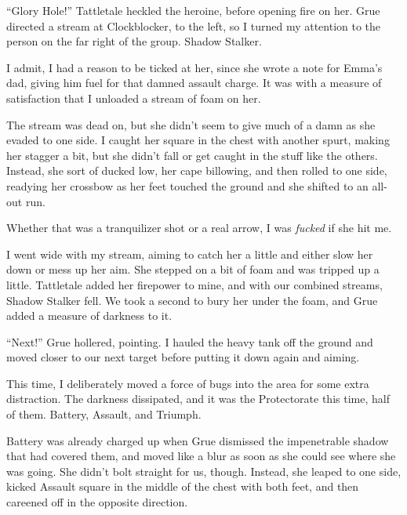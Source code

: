 ``Glory Hole!'' Tattletale heckled the heroine, before opening fire on her.  Grue directed a stream at Clockblocker, to the left, so I turned my attention to the person on the far right of the group.  Shadow Stalker.



I admit, I had a reason to be ticked at her, since she wrote a note for Emma's dad, giving him fuel for that damned assault charge.  It was with a measure of satisfaction that I unloaded a stream of foam on her.



The stream was dead on, but she didn't seem to give much of a damn as she evaded to one side.  I caught her square in the chest with another spurt, making her stagger a bit, but she didn't fall or get caught in the stuff like the others.  Instead, she sort of ducked low, her cape billowing, and then rolled to one side, readying her crossbow as her feet touched the ground and she shifted to an all-out run.



Whether that was a tranquilizer shot or a real arrow, I was \emph{fucked} if she hit me.



I went wide with my stream, aiming to catch her a little and either slow her down or mess up her aim.  She stepped on a bit of foam and was tripped up a little.  Tattletale added her firepower to mine, and with our combined streams, Shadow Stalker fell.  We took a second to bury her under the foam, and Grue added a measure of darkness to it.



``Next!'' Grue hollered, pointing.  I hauled the heavy tank off the ground and moved closer to our next target before putting it down again and aiming.



This time, I deliberately moved a force of bugs into the area for some extra distraction.  The darkness dissipated, and it was the Protectorate this time, half of them.  Battery, Assault, and Triumph.



Battery was already charged up when Grue dismissed the impenetrable shadow that had covered them, and moved like a blur as soon as she could see where she was going.  She didn't bolt straight for us, though.  Instead, she leaped to one side, kicked Assault square in the middle of the chest with both feet, and then careened off in the opposite direction.



